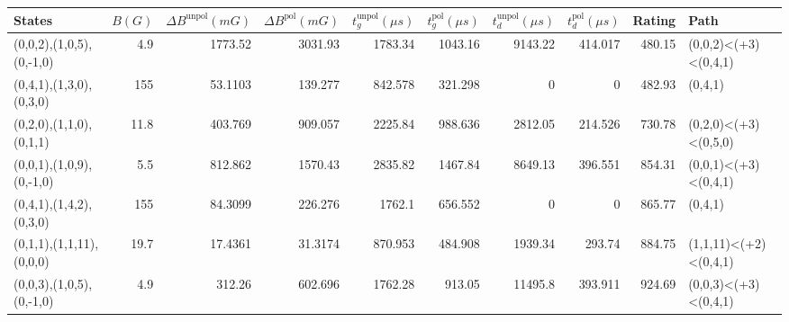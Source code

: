 \begin{tabular}{lrrrrrrrrl}
\hline
 {States}                 &   {$B(G)$} &   {$\Delta B^{\text{unpol}}(mG)$} &   {$\Delta B^{\text{pol}}(mG)$} &   {$t^{\text{unpol}}_{g}(\mu s)$} &   {$t^{\text{pol}}_{g}(\mu s)$} &   {$t^{\text{unpol}}_{d}(\mu s)$} &   {$t^{\text{pol}}_{d}(\mu s)$} &   {Rating} & {Path}                \\
\hline
 (0,0,2),(1,0,5),(0,-1,0) &        4.9 &                         1773.52   &                       3031.93   &                          1783.34  &                        1043.16  &                           9143.22 &                         414.017 &     480.15 & (0,0,2)<(+3)<(0,4,1)  \\
 (0,4,1),(1,3,0),(0,3,0)  &      155   &                           53.1103 &                        139.277  &                           842.578 &                         321.298 &                              0    &                           0     &     482.93 & (0,4,1)               \\
 (0,2,0),(1,1,0),(0,1,1)  &       11.8 &                          403.769  &                        909.057  &                          2225.84  &                         988.636 &                           2812.05 &                         214.526 &     730.78 & (0,2,0)<(+3)<(0,5,0)  \\
 (0,0,1),(1,0,9),(0,-1,0) &        5.5 &                          812.862  &                       1570.43   &                          2835.82  &                        1467.84  &                           8649.13 &                         396.551 &     854.31 & (0,0,1)<(+3)<(0,4,1)  \\
 (0,4,1),(1,4,2),(0,3,0)  &      155   &                           84.3099 &                        226.276  &                          1762.1   &                         656.552 &                              0    &                           0     &     865.77 & (0,4,1)               \\
 (0,1,1),(1,1,11),(0,0,0) &       19.7 &                           17.4361 &                         31.3174 &                           870.953 &                         484.908 &                           1939.34 &                         293.74  &     884.75 & (1,1,11)<(+2)<(0,4,1) \\
 (0,0,3),(1,0,5),(0,-1,0) &        4.9 &                          312.26   &                        602.696  &                          1762.28  &                         913.05  &                          11495.8  &                         393.911 &     924.69 & (0,0,3)<(+3)<(0,4,1)  \\

\end{tabular}
